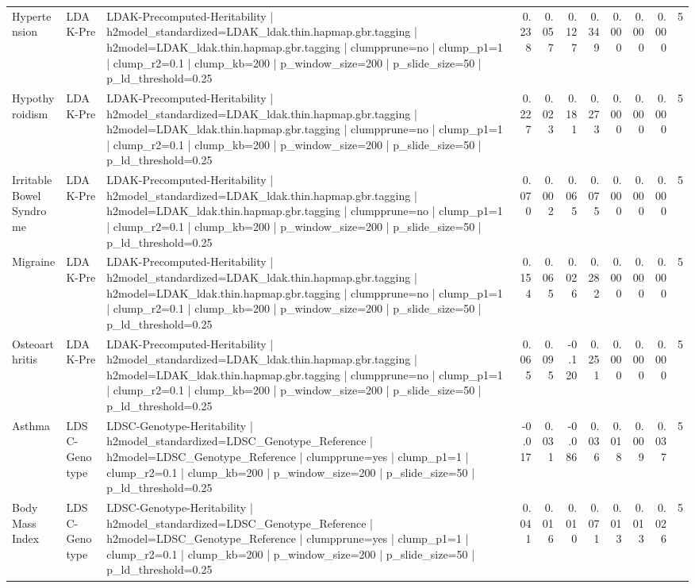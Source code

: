 \begin{landscape}
\begin{longtable}{p{2.4cm}p{1.8cm}p{6.0cm}rrrrrrrr}
Hypertension & LDAK-Pre & LDAK-Precomputed-Heritability | h2model\_standardized=LDAK\_ldak.thin.hapmap.gbr.tagging | h2model=LDAK\_ldak.thin.hapmap.gbr.tagging | clumpprune=no | clump\_p1=1 | clump\_r2=0.1 | clump\_kb=200 | p\_window\_size=200 | p\_slide\_size=50 | p\_ld\_threshold=0.25 & 0.238 & 0.057 & 0.127 & 0.349 & 0.000 & 0.000 & 0.000 & 5 \\
Hypothyroidism & LDAK-Pre & LDAK-Precomputed-Heritability | h2model\_standardized=LDAK\_ldak.thin.hapmap.gbr.tagging | h2model=LDAK\_ldak.thin.hapmap.gbr.tagging | clumpprune=no | clump\_p1=1 | clump\_r2=0.1 | clump\_kb=200 | p\_window\_size=200 | p\_slide\_size=50 | p\_ld\_threshold=0.25 & 0.227 & 0.023 & 0.181 & 0.273 & 0.000 & 0.000 & 0.000 & 5 \\
Irritable Bowel Syndrome & LDAK-Pre & LDAK-Precomputed-Heritability | h2model\_standardized=LDAK\_ldak.thin.hapmap.gbr.tagging | h2model=LDAK\_ldak.thin.hapmap.gbr.tagging | clumpprune=no | clump\_p1=1 | clump\_r2=0.1 | clump\_kb=200 | p\_window\_size=200 | p\_slide\_size=50 | p\_ld\_threshold=0.25 & 0.070 & 0.002 & 0.065 & 0.075 & 0.000 & 0.000 & 0.000 & 5 \\
Migraine & LDAK-Pre & LDAK-Precomputed-Heritability | h2model\_standardized=LDAK\_ldak.thin.hapmap.gbr.tagging | h2model=LDAK\_ldak.thin.hapmap.gbr.tagging | clumpprune=no | clump\_p1=1 | clump\_r2=0.1 | clump\_kb=200 | p\_window\_size=200 | p\_slide\_size=50 | p\_ld\_threshold=0.25 & 0.154 & 0.065 & 0.026 & 0.282 & 0.000 & 0.000 & 0.000 & 5 \\
Osteoarthritis & LDAK-Pre & LDAK-Precomputed-Heritability | h2model\_standardized=LDAK\_ldak.thin.hapmap.gbr.tagging | h2model=LDAK\_ldak.thin.hapmap.gbr.tagging | clumpprune=no | clump\_p1=1 | clump\_r2=0.1 | clump\_kb=200 | p\_window\_size=200 | p\_slide\_size=50 | p\_ld\_threshold=0.25 & 0.065 & 0.095 & -0.120 & 0.251 & 0.000 & 0.000 & 0.000 & 5 \\
Asthma & LDSC-Genotype & LDSC-Genotype-Heritability | h2model\_standardized=LDSC\_Genotype\_Reference | h2model=LDSC\_Genotype\_Reference | clumpprune=yes | clump\_p1=1 | clump\_r2=0.1 | clump\_kb=200 | p\_window\_size=200 | p\_slide\_size=50 | p\_ld\_threshold=0.25 & -0.017 & 0.031 & -0.086 & 0.036 & 0.018 & 0.009 & 0.037 & 5 \\
Body Mass Index & LDSC-Genotype & LDSC-Genotype-Heritability | h2model\_standardized=LDSC\_Genotype\_Reference | h2model=LDSC\_Genotype\_Reference | clumpprune=yes | clump\_p1=1 | clump\_r2=0.1 | clump\_kb=200 | p\_window\_size=200 | p\_slide\_size=50 | p\_ld\_threshold=0.25 & 0.041 & 0.016 & 0.010 & 0.071 & 0.013 & 0.013 & 0.026 & 5 \\

\end{longtable}
\end{landscape}

